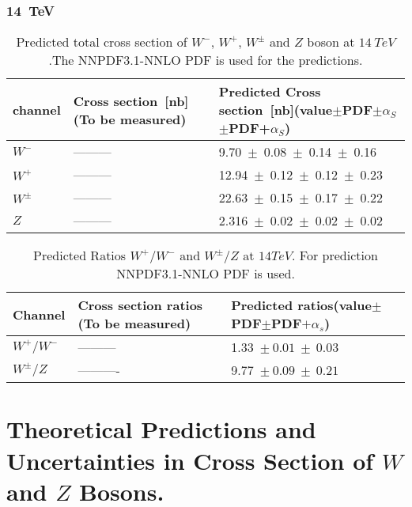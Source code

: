 \documentclass[a4paper,12pt]{report}
\numberwithin{equation}{section}
\begin{document}
\subsubsection{14~TeV}
\begin{table}[H]
\centering
\caption{Predicted total cross section of $W^{-}$, $W^{+}$, $W^{\pm}$ and $Z$ boson at $14~TeV$.The NNPDF3.1-NNLO PDF is used for the predictions.}
\begin{tabular}{|l|p{6cm}|p{6cm}| }
\hline
channel&\bf Cross section~[nb] \newline (To be measured) &\bf Predicted Cross section~[nb]\newline (value$\pm$PDF$\pm\alpha_{S}$ $\pm$PDF+$\alpha_{S}$)\\
\hline
\hline
$W^{-}$&---------&9.70~$\pm$~0.08~$\pm$~0.14~$\pm$~0.16\\
$W^{+}$&---------&12.94~$\pm$~0.12~$\pm$~0.12~$\pm$~0.23\\
$W^{\pm}$&---------&22.63~$\pm$~0.15~$\pm$~0.17~$\pm$~0.22\\
\hline
\hline
$Z$&---------&2.316~$\pm$~0.02~$\pm$~0.02~$\pm$~0.02\\
\hline
\end{tabular}
\end{table}

\begin{table}[H]
\centering
\caption{Predicted Ratios $W^{+}/W^{-}$ and $W^{\pm}/Z$ at $14TeV$. For prediction NNPDF3.1-NNLO PDF is used.} 
\begin{tabular}{|l|p{6cm}|p{6cm}|}
\hline
Channel&\bf Cross section ratios \newline (To be measured) &\bf Predicted ratios\newline(value$\pm$PDF$\pm$PDF$+\alpha_{s}$)\\
\hline
\hline
$W^{+}/W^{-}$&---------&1.33~$\pm~0.01~\pm~0.03$\\
$W^{\pm}/Z$&----------&9.77~$\pm~0.09~\pm~0.21$\\
\hline
\end{tabular}
\end{table}


\section{Theoretical Predictions and Uncertainties in Cross Section of $W$ and $Z$ Bosons.}
\end{document}

